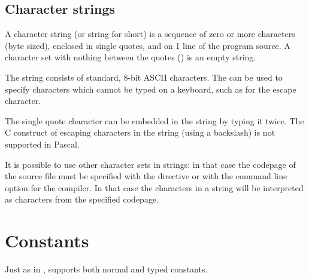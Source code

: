 \section{Character strings}
A character string (or string for short) is a sequence of zero or more
characters (byte sized), enclosed in single quotes, and on 1 line of the 
program source. A character set with nothing between the quotes () is an empty
string.

The string consists of standard, 8-bit ASCII characters. The  can be used to specify characters which cannot be typed on a
keyboard, such as  for the escape character. 

The single quote character can be embedded in the string by typing it twice. 
The C construct of escaping characters in the string (using a backslash) 
is not supported in Pascal.

It is possible to use other character sets in strings: in that case the 
codepage of the source file must be specified with the 
directive or with the  command line option for the compiler. In that
case the characters in a string will be interpreted as characters from the
specified codepage.

\chapter{Constants}
Just as in \tp, \fpc supports both normal and typed constants.

